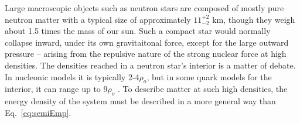 
Large macroscopic objects such as neutron stars are composed of mostly pure neutron matter \cite{neutronstar} with a typical size of approximately $11^{+2}_{-2}$ \si{\kilo\metre}, though they weigh about 1.5 times the mass of our sun. Such a compact star would normally collapse inward, under its own gravitaitonal force, except for the large outward pressure -- arising from the repulsive nature of the strong nuclear force at high densities.  The densities reached in a neutron star's interior is a matter of debate. In nucleonic models it is typically 2-4$\rho_o$, but in some quark models for the interior, it can range up to  9$\rho_o$ \cite{neutronstar}. To describe matter at such high densities, the energy density of the system must be described in a more general way than Eq.~\ref{eq:semiEmp}.





